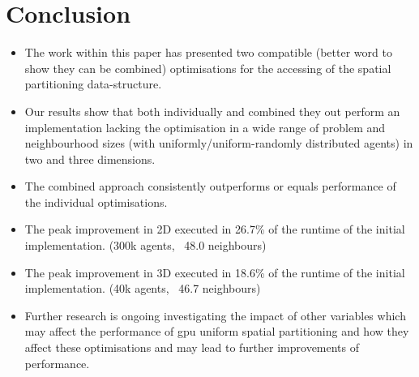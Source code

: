 \section{Conclusion\label{sec:conclusion}}
    \begin{itemize}
      \item The work within this paper has presented two compatible (better word to show they can be combined) optimisations for the accessing of the spatial partitioning data-structure.
      \item Our results show that both individually and combined they out perform an implementation lacking the optimisation in a wide range of problem and neighbourhood sizes (with uniformly/uniform-randomly distributed agents) in two and three dimensions.
      \item The combined approach consistently outperforms or equals performance of the individual optimisations.
      \item The peak improvement in 2D executed in 26.7\% of the runtime of the initial implementation. (300k agents, ~48.0 neighbours)
      \item The peak improvement in 3D executed in 18.6\% of the runtime of the initial implementation. (40k agents, ~46.7 neighbours)
      \item Further research is ongoing investigating the impact of other variables which may affect the performance of \gls{gpu} uniform spatial partitioning and how they affect these optimisations and may lead to further improvements of performance.
    \end{itemize}